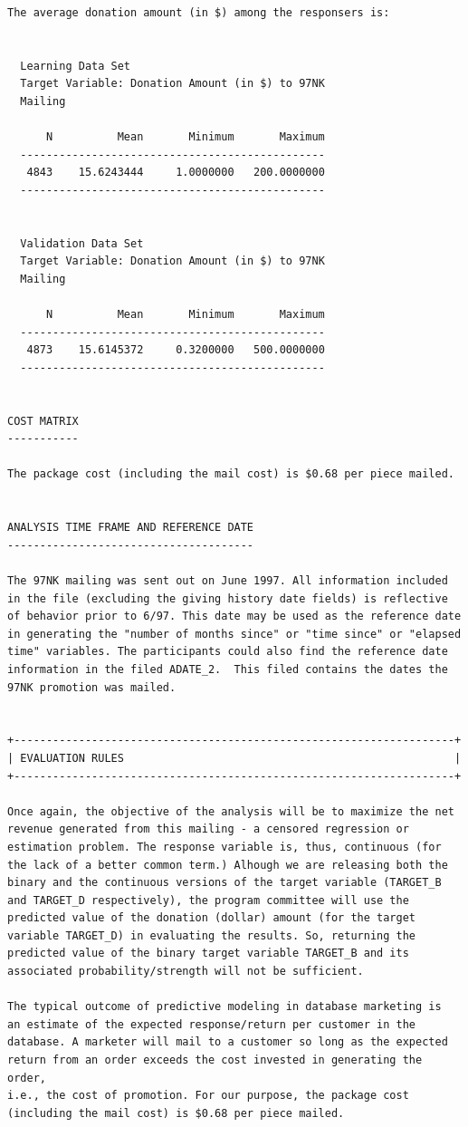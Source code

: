 \documentclass[
  11pt,
  a4paper,
  DIV=12,captions=tableheading,oneside,titlepage]{scrbook}
\begin{document}
\begin{verbatim}
The average donation amount (in $) among the responsers is: 


  Learning Data Set
  Target Variable: Donation Amount (in $) to 97NK 
  Mailing  

      N          Mean       Minimum       Maximum
  -----------------------------------------------
   4843    15.6243444     1.0000000   200.0000000
  -----------------------------------------------


  Validation Data Set
  Target Variable: Donation Amount (in $) to 97NK 
  Mailing 

      N          Mean       Minimum       Maximum
  -----------------------------------------------
   4873    15.6145372     0.3200000   500.0000000
  -----------------------------------------------


COST MATRIX
-----------

The package cost (including the mail cost) is $0.68 per piece mailed.


ANALYSIS TIME FRAME AND REFERENCE DATE
--------------------------------------

The 97NK mailing was sent out on June 1997. All information included
in the file (excluding the giving history date fields) is reflective
of behavior prior to 6/97. This date may be used as the reference date
in generating the "number of months since" or "time since" or "elapsed
time" variables. The participants could also find the reference date
information in the filed ADATE_2.  This filed contains the dates the
97NK promotion was mailed.


+--------------------------------------------------------------------+
| EVALUATION RULES                                                   |
+--------------------------------------------------------------------+

Once again, the objective of the analysis will be to maximize the net
revenue generated from this mailing - a censored regression or
estimation problem. The response variable is, thus, continuous (for 
the lack of a better common term.) Alhough we are releasing both the
binary and the continuous versions of the target variable (TARGET_B
and TARGET_D respectively), the program committee will use the
predicted value of the donation (dollar) amount (for the target
variable TARGET_D) in evaluating the results. So, returning the
predicted value of the binary target variable TARGET_B and its
associated probability/strength will not be sufficient. 

The typical outcome of predictive modeling in database marketing is 
an estimate of the expected response/return per customer in the
database. A marketer will mail to a customer so long as the expected 
return from an order exceeds the cost invested in generating the order, 
i.e., the cost of promotion. For our purpose, the package cost 
(including the mail cost) is $0.68 per piece mailed.


\end{verbatim}
\end{document}
